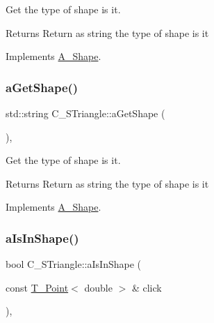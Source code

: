 Get the type of shape is it. 

\begin{DoxyReturn}{Returns}
Return as string the type of shape is it 
\end{DoxyReturn}


Implements \hyperlink{classA__Shape_a1b202256a4e5dcb0edab4ab93a37122c}{A\+\_\+\+Shape}.

\mbox{\label{classC__STriangle_a40c1434870b99112c4457819c9295483}} 
\subsubsection{\texorpdfstring{a\+Get\+Shape()}{aGetShape()}\hspace{0.1cm}{\footnotesize\ttfamily [2/2]}}
{\footnotesize\ttfamily std\+::string C\+\_\+\+S\+Triangle\+::a\+Get\+Shape (\begin{DoxyParamCaption}{ }\end{DoxyParamCaption})\hspace{0.3cm}{\ttfamily [override]}, {\ttfamily [virtual]}}



Get the type of shape is it. 

\begin{DoxyReturn}{Returns}
Return as string the type of shape is it 
\end{DoxyReturn}


Implements \hyperlink{classA__Shape_a1b202256a4e5dcb0edab4ab93a37122c}{A\+\_\+\+Shape}.

\mbox{\label{classC__STriangle_a3bc82d7ea53a6a058b9fb49bbd89282c}} 
\subsubsection{\texorpdfstring{a\+Is\+In\+Shape()}{aIsInShape()}\hspace{0.1cm}{\footnotesize\ttfamily [1/2]}}
{\footnotesize\ttfamily bool C\+\_\+\+S\+Triangle\+::a\+Is\+In\+Shape (\begin{DoxyParamCaption}\item[{const \hyperlink{classT__Point}{T\+\_\+\+Point}$<$ double $>$ \&}]{click }\end{DoxyParamCaption})\hspace{0.3cm}{\ttfamily [override]}, {\ttfamily [virtual]}}



